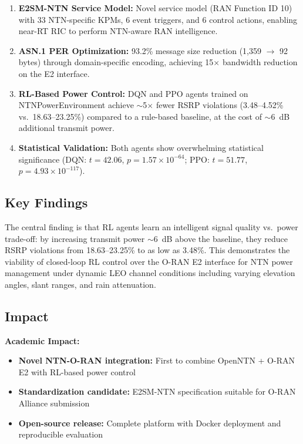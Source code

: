 \documentclass[conference]{IEEEtran}
\begin{document}
\begin{enumerate}
    \item \textbf{E2SM-NTN Service Model:} Novel service model (RAN Function ID 10) with 33 NTN-specific KPMs, 6 event triggers, and 6 control actions, enabling near-RT RIC to perform NTN-aware RAN intelligence.

    \item \textbf{ASN.1 PER Optimization:} 93.2\% message size reduction (1,359 $\rightarrow$ 92 bytes) through domain-specific encoding, achieving 15$\times$ bandwidth reduction on the E2 interface.

    \item \textbf{RL-Based Power Control:} DQN and PPO agents trained on NTNPowerEnvironment achieve $\sim$5$\times$ fewer RSRP violations (3.48--4.52\% vs.\ 18.63--23.25\%) compared to a rule-based baseline, at the cost of $\sim$6~dB additional transmit power.

    \item \textbf{Statistical Validation:} Both agents show overwhelming statistical significance (DQN: $t=42.06$, $p = 1.57 \times 10^{-64}$; PPO: $t=51.77$, $p = 4.93 \times 10^{-117}$).
\end{enumerate}

\subsection{Key Findings}

The central finding is that RL agents learn an intelligent signal quality vs.\ power trade-off: by increasing transmit power $\sim$6~dB above the baseline, they reduce RSRP violations from 18.63--23.25\% to as low as 3.48\%. This demonstrates the viability of closed-loop RL control over the O-RAN E2 interface for NTN power management under dynamic LEO channel conditions including varying elevation angles, slant ranges, and rain attenuation.

\subsection{Impact}

\textbf{Academic Impact:}
\begin{itemize}
    \item \textbf{Novel NTN-O-RAN integration:} First to combine OpenNTN + O-RAN E2 with RL-based power control
    \item \textbf{Standardization candidate:} E2SM-NTN specification suitable for O-RAN Alliance submission
    \item \textbf{Open-source release:} Complete platform with Docker deployment and reproducible evaluation
\end{itemize}
\end{document}
